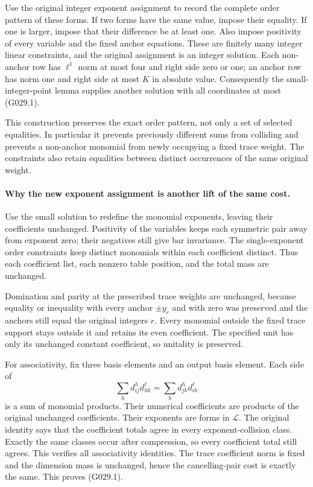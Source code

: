 Use the original integer exponent assignment to record
the complete order pattern of these forms. If two forms
have the same value, impose their equality. If one is
larger, impose that their difference be at least one.
Also impose positivity of every variable and the fixed
anchor equations. These are finitely many integer linear
constraints, and the original assignment is an integer
solution. Each non-anchor row has $\ell^1$ norm at most
four and right side zero or one; an anchor row has norm
one and right side at most $K$ in absolute value.
Consequently the small-integer-point lemma supplies
another solution with all coordinates at most (G029.1).

This construction preserves the exact order pattern,
not only a set of selected equalities. In particular it
prevents previously different sums from colliding and
prevents a non-anchor monomial from newly occupying a
fixed trace weight. The constraints also retain equalities
between distinct occurrences of the same original weight.

\paragraph{Why the new exponent assignment is another lift of the same cost.}
Use the small solution to redefine the monomial exponents,
leaving their coefficients unchanged. Positivity of the
variables keeps each symmetric pair away from exponent
zero; their negatives still give bar invariance. The
single-exponent order constraints keep distinct monomials
within each coefficient distinct. Thus each coefficient
list, each nonzero table position, and the total mass are
unchanged.

Domination and parity at the prescribed trace weights
are unchanged, because equality or inequality with every
anchor $\pm y_r$ and with zero was preserved and the
anchors still equal the original integers $r$.
Every monomial outside the fixed trace support stays
outside it and retains its even coefficient. The specified
unit has only its unchanged constant coefficient, so
unitality is preserved.

For associativity, fix three basis elements and an output
basis element. Each side of
\[
 \sum_h d_{ij}^h d_{hk}^{\ell}
       =\sum_h d_{jk}^h d_{ih}^{\ell}
\]
is a sum of monomial products. Their numerical coefficients
are products of the original unchanged coefficients.
Their exponents are forms in $\mathcal L$. The original
identity says that the coefficient totals agree in every
exponent-collision class. Exactly the same classes occur
after compression, so every coefficient total still
agrees. This verifies all associativity identities.
The trace coefficient norm is fixed and the dimension
mass is unchanged, hence the cancelling-pair cost is
exactly the same. This proves (G029.1).

